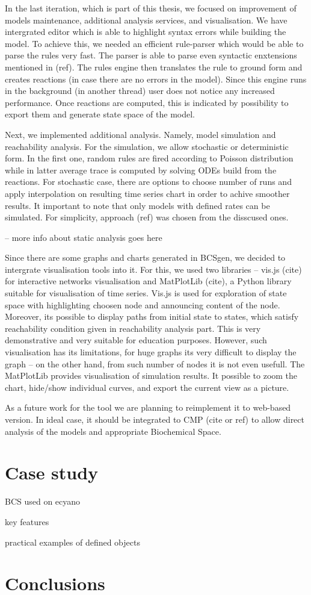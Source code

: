 \documentclass[12pt]{fithesis2}
\begin{document}
In the last iteration, which is part of this thesis, we focused on improvement of models maintenance, additional analysis services, and visualisation. We have intergrated editor which is able to highlight syntax errors while building the model. To achieve this, we needed an efficient rule-parser which would be able to parse the rules very fast. The parser is able to parse even syntactic enxtensions mentioned in (ref). The rules engine then translates the rule to ground form and creates reactions (in case there are no errors in the model). Since this engine runs in the background (in another thread) user does not notice any increased performance. Once reactions are computed, this is indicated by possibility to export them and generate state space of the model.

Next, we implemented additional analysis. Namely, model simulation and reachability analysis. For the simulation, we allow stochastic or deterministic form. In the first one, random rules are fired according to Poisson distribution while in latter average trace is computed by solving ODEs build from the reactions. For stochastic case, there are options to choose number of runs and apply interpolation on resulting time series chart in order to achive smoother results. It important to note that only models with defined rates can be simulated. For simplicity, approach (ref) was chosen from the disscused ones.

 -- more info about static analysis goes here

Since there are some graphs and charts generated in BCSgen, we decided to intergrate visualisation tools into it. For this, we used two libraries -- vis.js (cite) for interactive networks visualisation and MatPlotLib (cite), a Python library suitable for visualisation of time series. Vis.js is used for exploration of state space with highlighting choosen node and announcing content of the node. Moreover, its possible to display paths from initial state to states, which satisfy reachability condition given in reachability analysis part. This is very demonstrative and very suitable for education purposes. However, such visualisation has its limitations, for huge graphs its very difficult to display the graph -- on the other hand, from such number of nodes it is not even usefull. The MatPlotLib provides visualisation of simulation results. It possible to zoom the chart, hide/show individual curves, and export the current view as a picture.

As a future work for the tool we are planning to reimplement it to web-based version. In ideal case, it should be integrated to CMP (cite or ref) to allow direct analysis of the models and appropriate Biochemical Space.  

\chapter{Case study}

BCS used on ecyano

key features
 
practical examples of defined objects

\chapter{Conclusions}

\printbibliography
\end{document}
